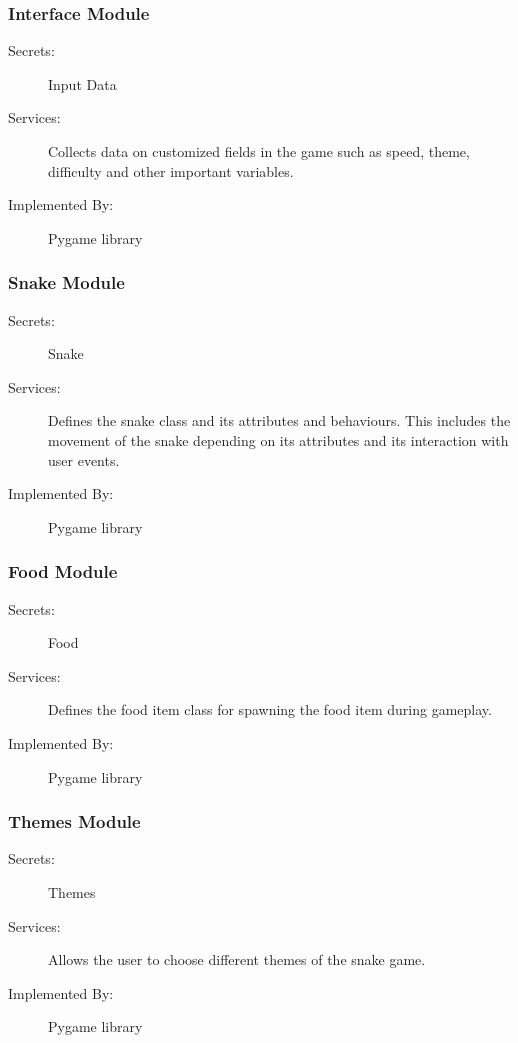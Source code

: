 \documentclass[12pt, titlepage]{article}
\begin{document}
\subsubsection{Interface Module}

\begin{description}
\item[Secrets:] Input Data
\item[Services:] Collects data on customized fields in the game
such as speed, theme, difficulty and other important variables.
\item[Implemented By:] Pygame library
\end{description}

\subsubsection{Snake Module}

\begin{description}
\item[Secrets:] Snake 
\item[Services:] Defines the snake class and its attributes and behaviours. This 
includes the movement of the snake depending on its attributes and its interaction with
user events.
\item[Implemented By:] Pygame library
\end{description}


\subsubsection{Food Module}

\begin{description}
\item[Secrets:] Food 
\item[Services:] Defines the food item class for spawning the food item during gameplay.
\item[Implemented By:] Pygame library
\end{description}

\subsubsection{Themes Module}

\begin{description}
\item[Secrets:] Themes 
\item[Services:] Allows the user to choose different themes of the snake game.
\item[Implemented By:] Pygame library
\end{description}
\end{document}
